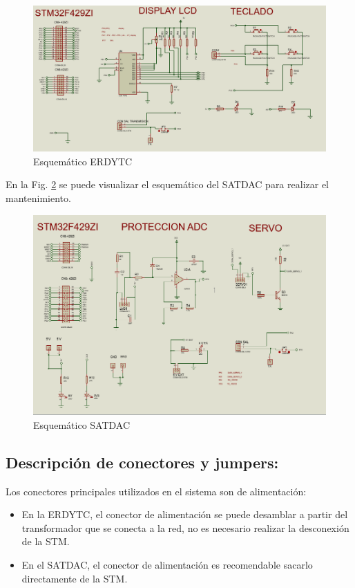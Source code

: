 \documentclass[conference]{IEEEtran}
\begin{document}
\begin{figure}[htbp]
\centering
\includegraphics[width=.9\linewidth]{../../images/estacionEsquematico.png}
\caption{\label{fig:estacionEsquematico}Esquemático ERDYTC}
\end{figure}

En la Fig. \ref{fig:cuboEsquematico} se puede visualizar el esquemático del SATDAC para realizar el mantenimiento.

\begin{figure}[htbp]
\centering
\includegraphics[width=.9\linewidth]{../../images/cuboEsquematico.png}
\caption{\label{fig:cuboEsquematico}Esquemático SATDAC}
\end{figure}

\subsection{Descripción de conectores y jumpers:}
\label{sec:org6677738}
Los conectores principales utilizados en el sistema son de alimentación:

\begin{itemize}
\item En la ERDYTC, el conector de alimentación se puede desamblar a partir del transformador que se conecta a la red, no es necesario realizar la desconexión de la STM.
\item En el SATDAC, el conector de alimentación es recomendable sacarlo directamente de la STM.
\end{itemize}
\end{document}
